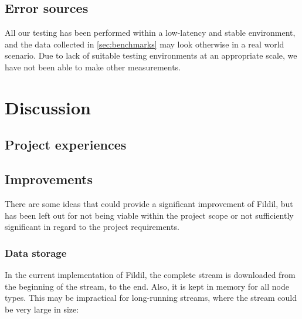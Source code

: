 \documentclass[10pt, a4paper]{article}
\begin{document}
\subsection{Error sources}

All our testing has been performed within a low-latency and stable environment,
and the data collected in \autoref{sec:benchmarks} may look otherwise in a real
world scenario. Due to lack of suitable testing environments at an appropriate
scale, we have not been able to make other measurements.

\section{Discussion}
\label{sec:discussion}

\subsection{Project experiences}


\subsection{Improvements}

There are some ideas that could provide a significant improvement of Fildil, but
has been left out for not being viable within the project scope or not
sufficiently significant in regard to the project requirements.

\subsubsection{Data storage}
\label{sec:storage-improvements}

In the current implementation of Fildil, the complete stream is downloaded from
the beginning of the stream, to the end. Also, it is kept in memory for all node
types. This may be impractical for long-running streams, where the stream could
be very large in size:
\end{document}
